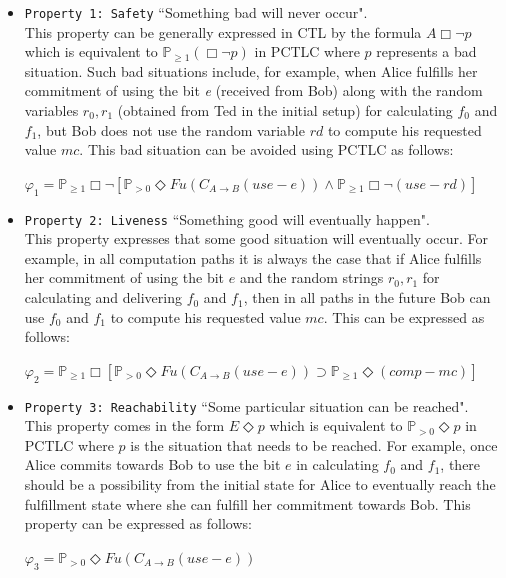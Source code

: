 \begin{itemize}
\item \texttt{Property 1: Safety} ``Something bad will never occur".\\
This property can be generally expressed in CTL by the formula
$A\Box\neg p$ which is equivalent to $\mathbb{P}_{\geq1}(\Box\neg
p)$ in PCTLC where $p$ represents a bad situation. Such bad
situations include, for example, when Alice fulfills her
commitment of using the bit \emph{e} (received from Bob) along
with the random variables $r_0, r_1$ (obtained from Ted in the
initial setup) for calculating $f_0$ and $f_1$, but Bob does not
use the random variable $rd$ to compute his requested value
$mc$. This bad situation can be avoided using PCTLC as follows:

$\varphi_1= \mathbb{P}_{\geq1}\Box\neg[\mathbb{P}_{>0} \Diamond
Fu(C_{A\rightarrow B} (use-e))\wedge \mathbb{P}_{\geq1}\Box\neg
(use-rd)]$


\item \texttt{Property 2: Liveness} ``Something good will eventually
happen".\\
This property expresses that some good situation will eventually
occur. For example, in all computation paths it is always the case
that if Alice fulfills her commitment of using the bit $e$ and the
random strings $r_0, r_1$ for calculating and delivering $f_0$ and
$f_1$, then in all paths in the future Bob can use $f_0$ and $f_1$
to compute his requested value $mc$. This can be expressed as
follows:

$\varphi_2= \mathbb{P}_{\geq1}\Box[\mathbb{P}_{>0}\Diamond
Fu(C_{A\rightarrow B} (use-e))\supset \mathbb{P}_{\geq1}\Diamond
(comp-mc)]$


\item \texttt{Property 3: Reachability} ``Some particular situation
can be reached".\\
This property comes in the form $E\Diamond p$ which is equivalent
to $\mathbb{P}_{>0}\Diamond p$ in PCTLC where $p$ is the situation
that needs to be reached. For example, once Alice commits towards
Bob to use the bit $e$ in calculating $f_0$ and $f_1$, there
should be a possibility from the initial state for Alice to
eventually reach the fulfillment state where she can fulfill her
commitment towards Bob. This property can be expressed as
follows:

$\varphi_3= \mathbb{P}_{>0}\Diamond Fu(C_{A\rightarrow B} (use-e))$

\end{itemize}


